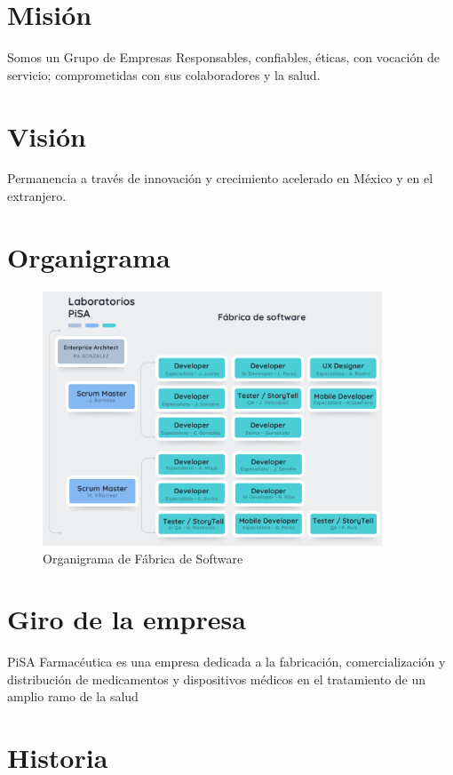\documentclass[12pt,letterpaper,spanish, xcolor=table]{report}
\begin{document}


\section{Misión}
Somos un Grupo de Empresas Responsables, confiables, éticas, con vocación de servicio; comprometidas con sus colaboradores y la salud.

\section{Visión}
Permanencia a través de innovación y crecimiento acelerado en México y en el extranjero.
	
\section{Organigrama}

\begin{figure}[H]
	\centering
	\includegraphics[width=0.9\textwidth]{Imagenes/OrganigramaPisa.png}
	\caption{Organigrama de Fábrica de Software}\label{a1}
\end{figure}
	
\section{Giro de la empresa}

PiSA Farmacéutica es una empresa dedicada a la fabricación, comercialización y distribución de medicamentos y dispositivos médicos en el tratamiento de un amplio ramo de la salud

\section{Historia}
\end{document}
